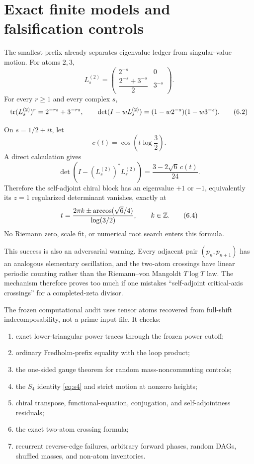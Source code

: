 \section{Exact finite models and falsification controls}
\label{sec:experiment}

The smallest prefix already separates eigenvalue ledger from singular-value
motion.  For atoms $2,3$,
\[
 L_s^{(2)}=
 \begin{pmatrix}
 2^{-s}&0\\[1mm]
 \dfrac{2^{-s}+3^{-s}}2&3^{-s}
 \end{pmatrix}.                              \tag{6.1}
\]
For every $r\ge1$ and every complex $s$,
\[
 \operatorname{tr}(L_s^{(2)})^r=2^{-rs}+3^{-rs},
 \qquad
 \det(I-wL_s^{(2)})=(1-w2^{-s})(1-w3^{-s}). \tag{6.2}
\]

On $s=1/2+it$, let
\[
 c(t)=\cos\left(t\log\frac32\right).
\]
A direct calculation gives
\[
 \det\left(I-(L_s^{(2)})^*L_s^{(2)}\right)
 =\frac{3-2\sqrt6\,c(t)}{24}.                \tag{6.3}
\]
Therefore the self-adjoint chiral block has an eigenvalue $+1$ or $-1$,
equivalently its $z=1$ regularized determinant vanishes, exactly at
\[
 t=\frac{2\pi k\pm\arccos(\sqrt6/4)}{\log(3/2)},
 \qquad k\in\mathbb Z.                             \tag{6.4}
\]
No Riemann zero, scale fit, or numerical root search enters this formula.

This success is also an adversarial warning.  Every adjacent pair
$(p_n,p_{n+1})$ has an analogous elementary oscillation, and the two-atom
crossings have linear periodic counting rather than the Riemann--von
Mangoldt $T\log T$ law.  The mechanism therefore proves too much if one
mistakes ``self-adjoint critical-axis crossings'' for a completed-zeta
divisor.

The frozen computational audit uses tensor atoms recovered from full-shift
indecomposability, not a prime input file.  It checks:
\begin{enumerate}
  \item exact lower-triangular power traces through the frozen power cutoff;
  \item ordinary Fredholm-prefix equality with the loop product;
  \item the one-sided gauge theorem for random mass-noncommuting controls;
  \item the $S_4$ identity \cref{eq:s4} and strict motion at nonzero heights;
  \item chiral transpose, functional-equation, conjugation, and
        self-adjointness residuals;
  \item the exact two-atom crossing formula;
  \item recurrent reverse-edge failures, arbitrary forward phases, random
        DAGs, shuffled masses, and non-atom inventories.
\end{enumerate}


